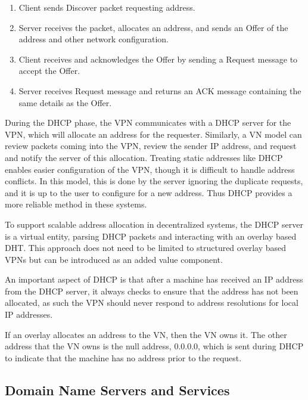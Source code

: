 \begin{enumerate}

\item Client sends Discover packet requesting address.

\item Server receives the packet, allocates an address, and sends an Offer of
the address and other network configuration.

\item Client receives and acknowledges the Offer by sending a Request message
to accept the Offer.

\item Server receives Request message and returns an ACK message containing the
same details as the Offer.

\end{enumerate}

During the DHCP phase, the VPN communicates with a DHCP server for the VPN,
which will allocate an address for the requester.  Similarly, a VN model can
review packets coming into the VPN, review the sender IP address, and request
and notify the server of this allocation.  Treating static addresses like DHCP
enables easier configuration of the VPN, though it is difficult to handle
address conflicts.  In this model, this is done by the server ignoring the
duplicate requests, and it is up to the user to configure for a new address.
Thus DHCP provides a more reliable method in these systems.

To support scalable address allocation in decentralized systems, the
DHCP server is a virtual entity, parsing DHCP packets and interacting with
an overlay based DHT.  This approach does not need to be limited to structured
overlay based VPNs but can be introduced as an added value component.

An important aspect of DHCP is that after a machine has received an IP address
from the DHCP server, it always checks to ensure that the address has not been
allocated, as such the VPN should never respond to address resolutions for
local IP addresses.

If an overlay allocates an address to the VN, then the VN owns it.  The other
address that the VN owns is the null address, 0.0.0.0, which is sent during
DHCP to indicate that the machine has no address prior to the request.

\subsection{Domain Name Servers and Services}

